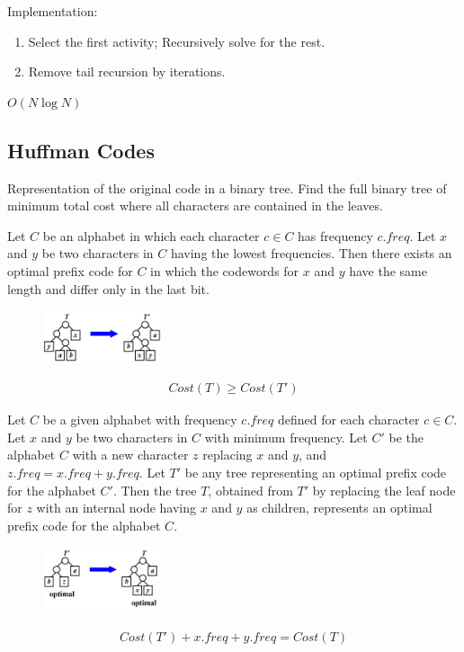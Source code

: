 Implementation:
\begin{enumerate}
    \item Select the first activity; Recursively solve for the rest.
    \item Remove tail recursion by iterations.
\end{enumerate}
$O(N\log N)$

\subsection{Huffman Codes}
Representation of the original code in a binary tree. Find the full binary tree of minimum total cost where all characters are contained in the leaves.

\begin{lemma}
    Let $C$ be an alphabet in which each character $c \in C$ has frequency $c.freq$.  Let $x$ and $y$ be two characters in $C$ having the lowest frequencies.  Then there exists an optimal prefix code for $C$ in which the codewords for $x$ and $y$ have the same length and differ only in the last bit.
    \begin{figure}[!htb]
        \centering
        \includegraphics[width=0.309\textwidth]{pic/ADS9/Lemma1.png}
    \end{figure}
    \begin{align*}
        Cost(T)\ge Cost(T')
    \end{align*}
\end{lemma}

\begin{lemma}
    Let $C$ be a given alphabet with frequency $c.freq$ defined for each character $c \in C$.  Let $x$ and $y$ be two characters in $C$ with minimum frequency.  Let $C'$ be the alphabet $C$ with a new character $z$ replacing $x$ and $y$, and $z.freq = x.freq + y.freq$.  Let $T'$ be any tree representing an optimal prefix code for the alphabet $C'$.  Then the tree $T$, obtained from $T'$ by replacing the leaf node for $z$ with an internal node having $x$ and $y$ as children, represents an optimal prefix code for the alphabet $C$.
    \begin{figure}[!htb]
        \centering
        \includegraphics[width=0.309\textwidth]{pic/ADS9/Lemma2.png}
    \end{figure}
    \begin{align*}
        Cost(T')+x.freq+y.freq=Cost(T)
    \end{align*}
\end{lemma}
